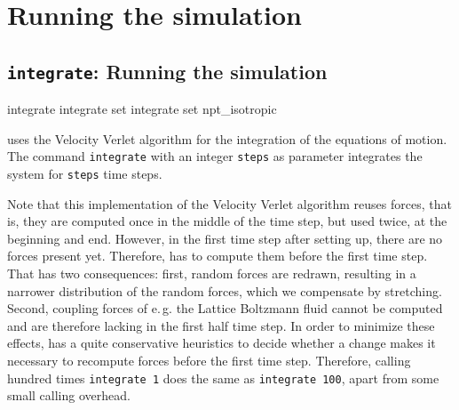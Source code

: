 %  
%   
%  
%  
%
\chapter{Running the simulation}
\label{chap:run}

\section{\texttt{integrate}: Running the simulation}

\begin{essyntax}
   integrate   
   integrate set 
   integrate set npt_isotropic    
\end{essyntax}

\es uses the Velocity Verlet algorithm for the integration of the
equations of motion. The command \texttt{integrate} with an integer
\texttt{steps} as parameter integrates the system for \texttt{steps}
time steps.

Note that this implementation of the Velocity Verlet algorithm reuses forces,
that is, they are computed once in the middle of the time step, but used twice,
at the beginning and end. However, in the first time step after setting up,
there are no forces present yet. Therefore, \es{} has to compute them before the
first time step. That has two consequences: first, random forces are redrawn,
resulting in a narrower distribution of the random forces, which we compensate
by stretching. Second, coupling forces of e.\,g. the Lattice Boltzmann fluid cannot
be computed and are therefore lacking in the first half time step. In order to
minimize these effects, \es{} has a quite conservative heuristics to decide whether
a change makes it necessary to recompute forces before the first time step. Therefore,
calling hundred times \texttt{integrate 1} does the same as \texttt{integrate 100},
apart from some small calling overhead.

